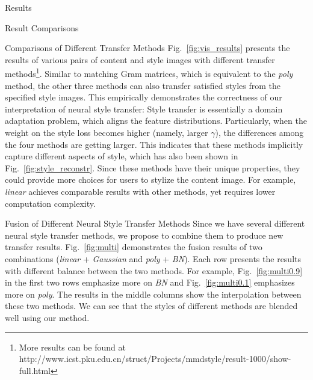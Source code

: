\begin{section}{Results}
\begin{subsection}{Result Comparisons}
\begin{paragraph}{Comparisons of Different Transfer Methods}
Fig.~\ref{fig:vis_results} presents the results of various pairs of content and style images with different transfer methods\footnote{More results can be found at\\ {{http://www.icst.pku.edu.cn/struct/Projects/mmdstyle/result-1000/show-full.html}}}. Similar to matching Gram matrices, which is equivalent to the \emph{poly} method, the other three methods can also transfer satisfied styles from the specified style images. This empirically demonstrates the correctness of our interpretation of neural style transfer: Style transfer is essentially a domain adaptation problem, which aligns the feature distributions. Particularly, when the weight on the style loss becomes higher (namely, larger $\gamma$), the differences among the four methods are getting larger. This indicates that these methods implicitly capture different aspects of style, which has also been shown in Fig.~\ref{fig:style_reconstr}. Since these methods have their unique properties, they could provide more choices for users to stylize the content image. For example, \emph{linear} achieves comparable results with other methods, yet requires lower computation complexity.




\end{paragraph}

\begin{paragraph}{Fusion of Different Neural Style Transfer Methods}
Since we have several different neural style transfer methods, we propose to combine them to produce new transfer results. Fig.~\ref{fig:multi} demonstrates the fusion results of two combinations (\emph{linear} + \emph{Gaussian} and \emph{poly} + \emph{BN}). Each row presents the results with different balance between the two methods. For example, Fig.~\ref{fig:multi0.9} in the first two rows emphasize more on \emph{BN} and Fig.~\ref{fig:multi0.1} emphasizes more on \emph{poly}. The results in the middle columns show the interpolation between these two methods. We can see that the styles of different methods are blended well using our method.




\end{paragraph}








\end{subsection}







\end{section}